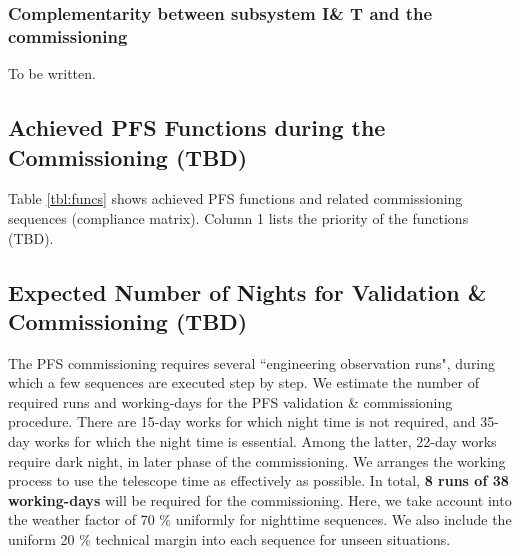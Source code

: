 
\subsubsection{Complementarity between subsystem I\& T and the commissioning}
To be written.







\subsection{Achieved PFS Functions during the Commissioning (TBD)}\label{sec:cmatrix}
Table \ref{tbl:funcs} shows achieved PFS functions and related commissioning sequences (compliance matrix).
Column 1 lists the priority of the functions (TBD).



\subsection{Expected Number of Nights for Validation \& Commissioning (TBD)}
The PFS commissioning requires several ``engineering observation runs", during which a few sequences are executed step by step.
We estimate the number of required runs and working-days for the PFS validation \& commissioning procedure.
There are 15-day works for which night time is not required, and 35-day works for which the night time is essential.
Among the latter, 22-day works require dark night,  in later phase of the commissioning.
We arranges the working process to use the telescope time as effectively as possible.
In total, {\bf 8 runs of 38 working-days} will be  required for the commissioning. 
Here, we take account into the weather factor of 70 \% uniformly  for nighttime sequences.
We also include the uniform 20 \% technical margin into each sequence for unseen situations.

